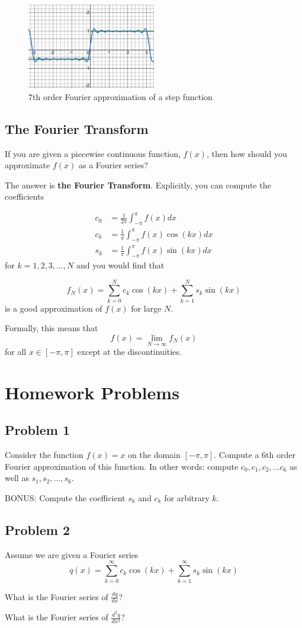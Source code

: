 \documentclass[12pt]{amsart}
\begin{document}
\begin{figure}
    \centering
    \includegraphics[width=0.5\textwidth]{./images/desmos-graph.png}
    \caption{7th order Fourier approximation of a step function}
    \label{fig:fourier}
\end{figure}


\subsection{The Fourier Transform}
If you are given a piecewise continuous function, $f(x)$, then how should
you approximate $f(x)$ as a Fourier series?

The answer is {\bf the Fourier Transform}. 
Explicitly, you can compute the coefficients

\begin{align}
c_0 &= \frac{1}{2\pi} \int_{-\pi}^\pi f(x) dx\\
c_k &= \frac{1}{\pi} \int_{-\pi}^\pi f(x) \cos(kx) dx \\
s_k &= \frac{1}{\pi} \int_{-\pi}^\pi f(x) \sin(kx) dx
\end{align}
for $k=1,2,3,\dots, N$ and you would find that

$$
f_N(x) = \sum_{k=0}^{N} c_k \cos(kx) + \sum_{k=1}^{N} s_k \sin(kx)
$$
is a good approximation of $f(x)$ for large $N$.

Formally, this means that 
$$
  f(x) = \lim_{N \to \infty} f_N(x)
$$
for all $x \in [-\pi, \pi]$ except at the discontinuities.


\section{Homework Problems}

\subsection{Problem 1}
Consider the function $f(x) = x$ on the domain $[-\pi, \pi]$.
Compute a 6th order Fourier approximation of this function.
In other words: compute $c_0, c_1, c_2, \dots c_6$ as well as $s_1, s_2, \dots, s_6$.

BONUS:  Compute the coefficient $s_k$ and $c_k$ for arbitrary $k$.

\subsection{Problem 2}
Assume we are given a Fourier series
$$
    q(x) = \sum_{k=0}^{\infty} c_k \cos(kx) + \sum_{k=1}^{\infty} s_k \sin(kx)
$$

What is the Fourier series of $\frac{dq}{dx}$?

What is the Fourier series of $\frac{d^2q}{dx^2}$?
\end{document}
